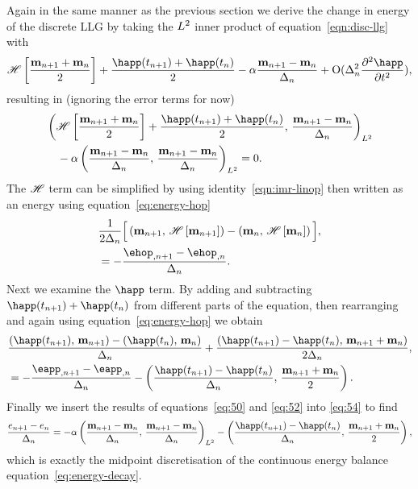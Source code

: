 Again in the same manner as the previous section we derive the change in energy of the discrete LLG by taking the $L^2$ inner product of equation~\eqref{eqn:disc-llg} with
\begin{equation}
  \mphop + \frac{\happ(t_{n+1}) + \happ(t_n)}{2} - \dampc \mpdmdt
  + \order{\dtn^2 \spd{\happ}{t}},
\end{equation}
resulting in (ignoring the error terms for now)
\begin{equation}
  \begin{aligned}
    &\ltip{\mphop + \frac{\happ(t_{n+1}) + \happ(t_n)}{2}}{\mpdmdt} \\
    & \quad - \dampc \ltip{\mpdmdt}{\mpdmdt} = 0.
    \label{eq:54}
  \end{aligned}
\end{equation}
The $\mathscr{H}$ term can be simplified by using identity~\eqref{eqn:imr-linop} then written as an energy using equation~\eqref{eq:energy-hop}
\begin{equation}
  \begin{aligned}
    &\frac{1}{2\dtn} \Big[\ip{\mv_{n+1}}{\hop \left[\mv_{n+1} \right]}
      - \ip{\mv_{n}}{ \hop\left[ \mv_{n} \right]} \Big], \\
    &= -\frac{\ehop_{,n+1} - \ehop_{,n}}{\dtn}.
  \end{aligned}
  \label{eq:50}
\end{equation}
Next we examine the $\happ$ term. By adding and subtracting $\happ(t_{n+1}) + \happ(t_n)$ from different parts of the equation, then rearranging and again using equation~\eqref{eq:energy-hop} we obtain
\begin{equation}
  \begin{aligned}
    &\frac{ \ip{\happ(t_{n+1})}{\mv_{n+1}} - \ip{\happ(t_n)}{\mv_{n}}}{\dtn}
    + \frac{\ip{\happ(t_{n+1}) -\happ(t_n)}{\mv_{n+1} + \mv_{n}}}{2\dtn}, \\
    &= -\frac{\eapp_{, n+1} - \eapp_{, n}}{\dtn}
    - \ip{\frac{\happ(t_{n+1}) -\happ(t_n)}{\dtn}}{\frac{\mv_{n+1} + \mv_{n}}{2}}.
  \end{aligned}
  \label{eq:52}
\end{equation}
Finally we insert the results of equations~\eqref{eq:50} and \eqref{eq:52} into \eqref{eq:54} to find
\begin{equation}
  \frac{\e_{n+1} - \e_n}{\dtn}
  = -\dampc \ltip{\mpdmdt}{\mpdmdt}
  - \ip{\frac{\happ(t_{n+1}) -\happ(t_n)}{\dtn}}{\frac{\mv_{n+1} + \mv_{n}}{2}},
\end{equation}
which is exactly the midpoint discretisation of the continuous energy balance equation~\eqref{eq:energy-decay}.



